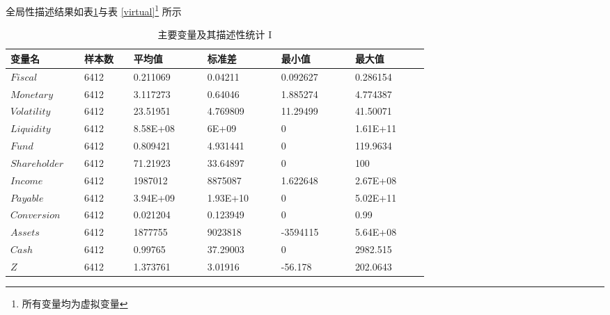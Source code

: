 全局性描述结果如表\ref{globaldesc}与表 \ref{virtual}\footnote{所有变量均为虚拟变量} 所示

\begin{table}[ht]
	\caption{主要变量及其描述性统计 I }
	\label{globaldesc}
	\begin{tabular}{p{0.15\linewidth}p{0.1\linewidth}p{0.15\linewidth}p{0.15\linewidth}p{0.15\linewidth}p{0.15\linewidth}}
		\textbf{变量名}    & \textbf{样本数} & \textbf{平均值} & \textbf{标准差} & \textbf{最小值} & \textbf{最大值} \\\hline
		\(Fiscal\)      & 6412         & 0.211069     & 0.04211      & 0.092627     & 0.286154     \\
		\(Monetary\)    & 6412         & 3.117273     & 0.64046      & 1.885274     & 4.774387     \\
		\(Volatility\)  & 6412         & 23.51951     & 4.769809     & 11.29499     & 41.50071     \\
		\(Liquidity\)   & 6412         & 8.58E+08     & 6E+09        & 0            & 1.61E+11     \\
		\(Fund\)        & 6412         & 0.809421     & 4.931441     & 0            & 119.9634     \\
		\(Shareholder\) & 6412         & 71.21923     & 33.64897     & 0            & 100          \\
		\(Income\)      & 6412         & 1987012      & 8875087      & 1.622648     & 2.67E+08     \\
		\(Payable\)     & 6412         & 3.94E+09     & 1.93E+10     & 0            & 5.02E+11     \\
		\(Conversion\)  & 6412         & 0.021204     & 0.123949     & 0            & 0.99         \\
		\(Assets\)      & 6412         & 1877755      & 9023818      & -3594115     & 5.64E+08     \\
		\(Cash\)        & 6412         & 0.99765      & 37.29003     & 0            & 2982.515     \\
		\(Z\)           & 6412         & 1.373761     & 3.01916      & -56.178      & 202.0643
	\end{tabular}
\end{table}
